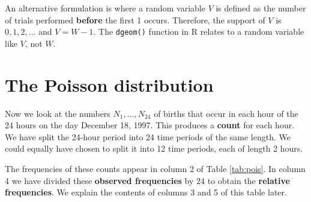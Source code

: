 \documentclass[
  british,
  11pt,
  openany, a4paper]{book}
\begin{document}
An alternative formulation is where a random variable \(V\) is defined as the number of trials performed \textbf{before} the first 1 occurs. Therefore, the support of \(V\) is \(0, 1, 2, ...\) and \(V = W - 1\). The \texttt{dgeom()} function in R relates to a random variable like \(V\), not \(W\).

\section{The Poisson distribution}\label{Poisson}

Now we look at the numbers \(N_1, \ldots, N_{24}\) of births that occur in each hour of the 24 hours on the day December 18, 1997. This produces a \textbf{count} for each hour. We have split the 24-hour period into 24 time periods of the same length. We could equally have chosen to split it into 12 time periods, each of length 2 hours.

The frequencies of these counts appear in column 2 of Table \ref{tab:pois}. In column 4 we have divided these \textbf{observed frequencies} by 24 to obtain the \textbf{relative frequencies}. We explain the contents of columns 3 and 5 of this table later.

 
  \providecommand{\huxb}[2]{\arrayrulecolor[RGB]{#1}\global\arrayrulewidth=#2pt}
  \providecommand{\huxvb}[2]{\color[RGB]{#1}\vrule width #2pt}
  \providecommand{\huxtpad}[1]{\rule{0pt}{#1}}
  \providecommand{\huxbpad}[1]{\rule[-#1]{0pt}{#1}}
\end{document}
